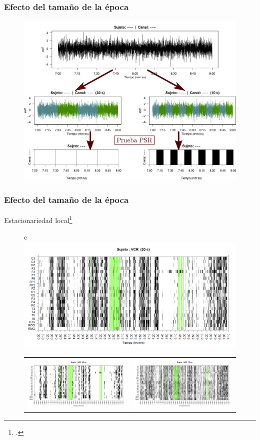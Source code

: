 \documentclass[11pt]{beamer}
\begin{document}
\begin{frame}\frametitle{Efecto del tama\~no de la \'epoca}
\begin{figure}
\centering
\includegraphics[width=0.9\linewidth]{./img_diagramas/epocas_diferentes.pdf}
\end{figure}
\end{frame}


\begin{frame}\frametitle{Efecto del tama\~no de la \'epoca}
{\small Estacionariedad local\footcite{Cohen77}}
\begin{figure}
\centering
\begin{tabular}{c}
\includegraphics[width=0.4\linewidth]
{./img_ejemplos/VCNNS1_est_30.png} \\
\begin{tabular}{cc}
\includegraphics[width=0.4\linewidth]
{./img_ejemplos/VCNNS1_est_60.png} 
&
\includegraphics[width=0.4\linewidth]
{./img_ejemplos/VCNNS1_est_10.png} 
\end{tabular}
\end{tabular}
\end{figure}
\end{frame}
\end{document}
